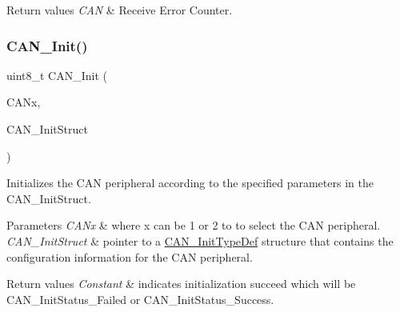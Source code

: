 \begin{DoxyRetVals}{Return values}
{\em C\+AN} & Receive Error Counter. \\
\hline
\end{DoxyRetVals}
\mbox{\label{group___c_a_n___private___functions_ga9023c35a9ab931ad4513fc5d19b4bd6c}} 
\subsubsection{\texorpdfstring{CAN\_Init()}{CAN\_Init()}}
{\footnotesize\ttfamily uint8\+\_\+t C\+A\+N\+\_\+\+Init (\begin{DoxyParamCaption}\item[{\mbox{\hyperlink{struct_c_a_n___type_def}{C\+A\+N\+\_\+\+Type\+Def}} $\ast$}]{C\+A\+Nx,  }\item[{\mbox{\hyperlink{struct_c_a_n___init_type_def}{C\+A\+N\+\_\+\+Init\+Type\+Def}} $\ast$}]{C\+A\+N\+\_\+\+Init\+Struct }\end{DoxyParamCaption})}



Initializes the C\+AN peripheral according to the specified parameters in the C\+A\+N\+\_\+\+Init\+Struct. 


\begin{DoxyParams}{Parameters}
{\em C\+A\+Nx} & where x can be 1 or 2 to to select the C\+AN peripheral. \\
\hline
{\em C\+A\+N\+\_\+\+Init\+Struct} & pointer to a \mbox{\hyperlink{struct_c_a_n___init_type_def}{C\+A\+N\+\_\+\+Init\+Type\+Def}} structure that contains the configuration information for the C\+AN peripheral. \\
\hline
\end{DoxyParams}

\begin{DoxyRetVals}{Return values}
{\em Constant} & indicates initialization succeed which will be C\+A\+N\+\_\+\+Init\+Status\+\_\+\+Failed or C\+A\+N\+\_\+\+Init\+Status\+\_\+\+Success. \\
\hline
\end{DoxyRetVals}
\mbox{\label{group___c_a_n___private___functions_gad1a8b2499a780b5bfa4accb3597b02f4}} 
